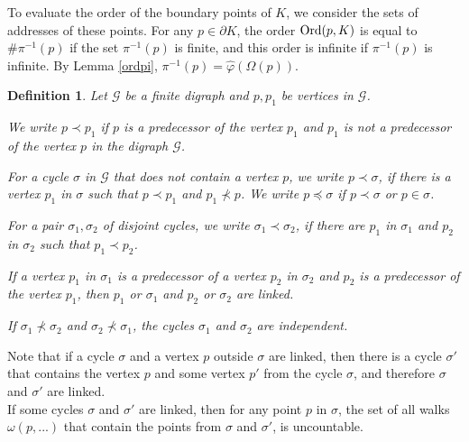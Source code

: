 \documentclass[11pt,reqno]{amsart}
\newtheorem{definition}[theorem]{Definition}
\begin{document}
To evaluate the order of the boundary points of $K$, we consider the sets of  addresses of these points.
For any $p\in {\partial} K$, the order ${\mathop{\rm Ord} \nolimits}(p,K)$ is equal to $\#\pi^{-1}(p)$ if the set $\pi^{-1}(p)$ is finite, and this order is infinite if $\pi^{-1}(p)$ is infinite. By Lemma \ref{ordpi},  $\pi^{-1}(p)=\hat\varphi( \Omega(p))$.

 \begin{definition}\label{cycles}\cite{BG} Let ${{\mathcal G}}$ be a finite digraph and $p, p_1$ be vertices in ${{\mathcal G}}$.
 
We write $p\prec p_1$ if $p$ is a predecessor of the vertex $p_1$ and $p_1$ is not a predecessor of the vertex $p$ in the digraph ${{\mathcal G}}$.
 
For a cycle $\sigma$ in ${{\mathcal G}}$ that does not contain a vertex $p$, we write $p\prec\sigma$, if there is a vertex $p_1$ in $\sigma $ such that $p \prec p_1$ and   $p_1\not\prec p$. We write $p\preceq\sigma$ if $p\prec\sigma$ or $p\in\sigma$.
    
For a pair  $\sigma_1,\sigma_2$ of disjoint cycles, we write $\sigma_1\prec \sigma_2$, if there are $p_1$ in $\sigma_1$ and $p_2$ in $\sigma_2$ such that $p_1\prec p_2$.
  
If a vertex $p_1$ in $\sigma_1$   is a predecessor of a vertex $p_2$ in $\sigma_2$ and $p_2$ is  a predecessor of the vertex $p_1$, then $p_1$ or $\sigma_1$ and  $p_2$ or $\sigma_2$ are {\em linked}.
  
If $\sigma_1\not\prec \sigma_2$ and  $\sigma_2\not\prec\sigma_1$, the  cycles $\sigma_1$ and $\sigma_2$ are {\em independent}. 
\end{definition}
   
Note that if a cycle $\sigma$ and a vertex $p$ outside $\sigma$ are linked, then there is a cycle $\sigma'$ that contains the vertex $p$ and some vertex $p'$ from the cycle $\sigma$, and therefore $\sigma$ and $\sigma'$ are linked. \\
If some cycles   $\sigma$ and $\sigma'$ are linked, then for any point $p$ in $\sigma$, the set of all walks  $\omega(p,...)$ that contain the points from $\sigma$ and $\sigma'$, is uncountable.
  
\end{document}
